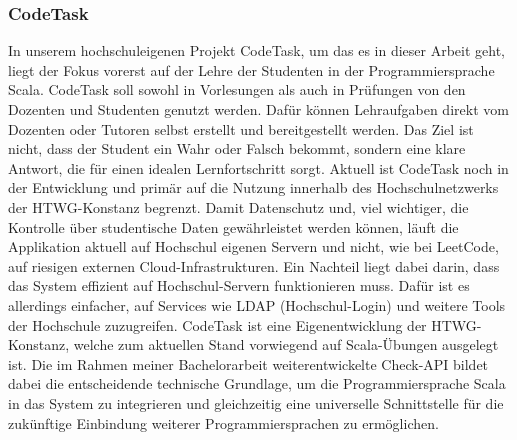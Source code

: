 	\subsubsection{CodeTask}
	In unserem hochschuleigenen Projekt CodeTask, um das es in dieser Arbeit geht, liegt der Fokus vorerst auf der Lehre der Studenten in der Programmiersprache Scala. CodeTask soll sowohl in Vorlesungen als auch in Prüfungen von den Dozenten und Studenten genutzt werden. Dafür können Lehraufgaben direkt vom Dozenten oder Tutoren selbst erstellt und bereitgestellt werden. Das Ziel ist nicht, dass der Student ein Wahr oder Falsch bekommt, sondern eine klare Antwort, die für einen idealen Lernfortschritt sorgt.
	Aktuell ist CodeTask noch in der Entwicklung und primär auf die Nutzung innerhalb des Hochschulnetzwerks der HTWG-Konstanz begrenzt. Damit Datenschutz und, viel wichtiger, die Kontrolle über studentische Daten gewährleistet werden können, läuft die Applikation aktuell auf Hochschul eigenen Servern und nicht, wie bei LeetCode, auf riesigen externen Cloud-Infrastrukturen.
	Ein Nachteil liegt dabei darin, dass das System effizient auf Hochschul-Servern funktionieren muss. Dafür ist es allerdings einfacher, auf Services wie LDAP (Hochschul-Login) und weitere Tools der Hochschule zuzugreifen.
	CodeTask ist eine Eigenentwicklung der HTWG-Konstanz, welche zum aktuellen Stand vorwiegend auf Scala-Übungen ausgelegt ist. Die im Rahmen meiner Bachelorarbeit weiterentwickelte Check-API bildet dabei die entscheidende technische Grundlage, um die Programmiersprache Scala in das System zu integrieren und gleichzeitig eine universelle Schnittstelle für die zukünftige Einbindung weiterer Programmiersprachen zu ermöglichen.


